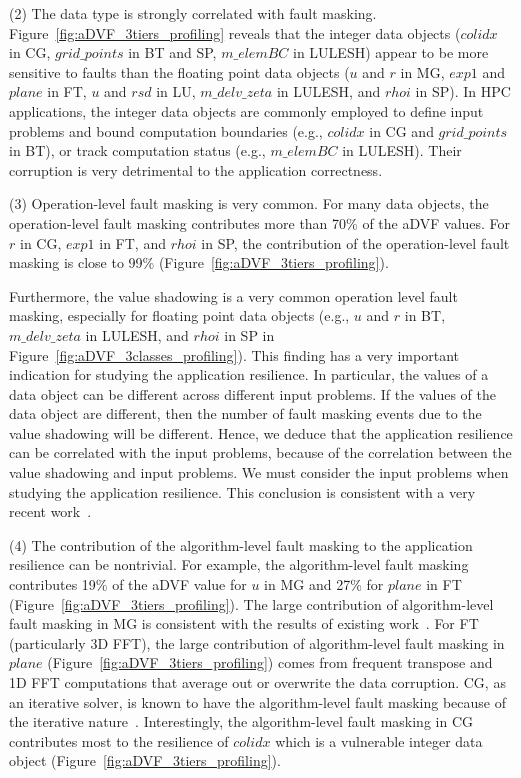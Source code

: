 (2) The data type is strongly correlated with fault masking.
Figure~\ref{fig:aDVF_3tiers_profiling} reveals that the integer data objects ($colidx$ in CG, $grid\_points$ in BT and SP, $m\_elemBC$ in LULESH) appear to be 
more sensitive to faults than the floating point data objects 
($u$ and $r$ in MG, $exp1$ and $plane$ in FT, $u$ and $rsd$ in LU, $m\_delv\_zeta$ in LULESH, and $rhoi$ in SP).
In HPC applications, the integer data objects are commonly employed to
define input problems and bound computation boundaries (e.g., $colidx$ in CG and $grid\_points$ in BT), 
or track computation status (e.g., $m\_elemBC$ in LULESH). Their corruption 
is very detrimental to the application correctness. 

(3) Operation-level fault masking is very common.
For many data objects, the operation-level fault masking contributes 
more than 70\% of the aDVF values. For $r$ in CG, $exp1$ in FT, and $rhoi$ in SP,
the contribution of the operation-level fault masking is close to 99\% (Figure~\ref{fig:aDVF_3tiers_profiling}).

Furthermore, the value shadowing is a very common operation level fault masking,
especially for floating point data objects (e.g., $u$ and $r$ in BT, $m\_delv\_zeta$ in LULESH, and $rhoi$ in SP in Figure~\ref{fig:aDVF_3classes_profiling}).
This finding has a very important indication for studying the application resilience.
In particular, the values of a data object can be different across different input problems. If the values of the data object are different, 
then the number of fault masking events due to the value shadowing will be different. 
Hence, we deduce that the application resilience
can be correlated with the input problems,
because of the correlation between the value shadowing and input problems. 
We must consider the input problems when studying the application resilience.
This conclusion is consistent with a very recent work~\cite{sc16:guo}.

(4) The contribution of the algorithm-level fault masking to the application resilience can be nontrivial.
For example, the algorithm-level fault masking contributes 19\% of the aDVF value for $u$ in MG and 27\% for $plane$ in FT (Figure~\ref{fig:aDVF_3tiers_profiling}).
The large contribution of algorithm-level fault masking in MG is consistent with
the results of existing work~\cite{mg_ics12}. 
For FT (particularly 3D FFT), the large contribution of algorithm-level fault masking in $plane$ (Figure~\ref{fig:aDVF_3tiers_profiling})
comes from frequent transpose and 1D FFT computations that average out 
or overwrite the data corruption.
CG, as an iterative solver, is known to have the algorithm-level fault masking
because of the iterative nature~\cite{2-shantharam2011characterizing}.
Interestingly, the algorithm-level fault masking in CG contributes most to the resilience of $colidx$ which is a vulnerable integer data object (Figure~\ref{fig:aDVF_3tiers_profiling}).

